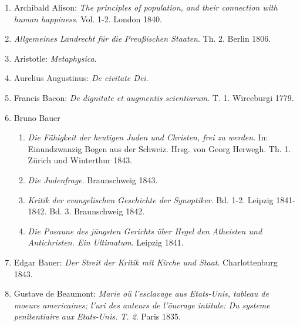 \begin{enumerate}

\item Archibald Alison: \textit{The principles of population, and their connection with human happiness}. Vol. 1-2. London 1840.

\item \textit{Allgemeines Landrecht für die Preußischen Staaten}. Th. 2. Berlin 1806.

\item Aristotle: \textit{Metaphysica}.

\item Aurelius Augustinus: \textit{De civitate Dei}.

\item Francis Bacon: \textit{De dignitate et augmentis scientiarum}. T. 1. Wirceburgi
1779.

\item Bruno Bauer
\begin{enumerate}
    \item \textit{Die Fähigkeit der heutigen Juden und Christen, frei zu werden}. In: Einundzwanzig Bogen aus der Schweiz. Hrsg. von Georg Herwegh. Th. 1. Zürich und Winterthur 1843.
    \item \textit{Die Judenfrage}. Braunschweig 1843.
    \item \textit{Kritik der evangelischen Geschichte der Synoptiker}. Bd. 1-2. Leipzig 1841-1842. Bd. 3. Braunschweig 1842.
    \item \textit{Die Posaune des jüngsten Gerichts über Hegel den Atheisten und Antichristen. Ein Ultimatum}. Leipzig 1841.
\end{enumerate}

\item Edgar Bauer: \textit{Der Streit der Kritik mit Kirche und Staat}. Charlottenburg 1843.

\item Gustave de Beaumont: \textit{Marie oü l'esclavage aus Etats-Unis, tableau de moeurs americaines; l'uri des auteurs de l'öuvrage intitule: Du systeme penitentiaire aux Etats-Unis. T. 2}. Paris 1835.


\end{enumerate}
